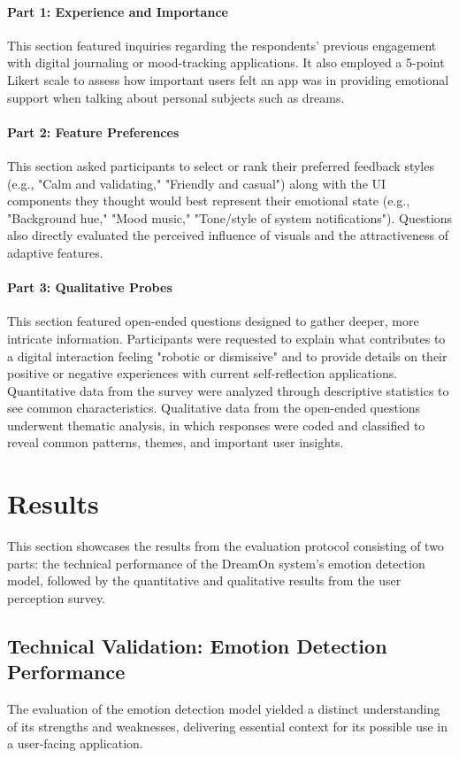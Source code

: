 \documentclass[conference]{IEEEtran}
\begin{document}
	\paragraph{Part 1: Experience and Importance} This section featured inquiries regarding the respondents’ previous engagement with digital journaling or mood-tracking applications. It also employed a 5-point Likert scale to assess how important users felt an app was in providing emotional support when talking about personal subjects such as dreams.
	\paragraph{Part 2: Feature Preferences} This section asked participants to select or rank their preferred feedback styles (e.g., "Calm and validating," "Friendly and casual") along with the UI components they thought would best represent their emotional state (e.g., "Background hue," "Mood music," "Tone/style of system notifications"). Questions also directly evaluated the perceived influence of visuals and the attractiveness of adaptive features.
	\paragraph{Part 3: Qualitative Probes} This section featured open-ended questions designed to gather deeper, more intricate information. Participants were requested to explain what contributes to a digital interaction feeling "robotic or dismissive" and to provide details on their positive or negative experiences with current self-reflection applications.
	Quantitative data from the survey were analyzed through descriptive statistics to see common characteristics. Qualitative data from the open-ended questions underwent thematic analysis, in which responses were coded and classified to reveal common patterns, themes, and important user insights.
	
	\section{Results}
	This section showcases the results from the evaluation protocol consisting of two parts: the technical performance of the DreamOn system's emotion detection model, followed by the quantitative and qualitative results from the user perception survey.
	
	\subsection{Technical Validation: Emotion Detection Performance}
	The evaluation of the emotion detection model yielded a distinct understanding of its strengths and weaknesses, delivering essential context for its possible use in a user-facing application.
	
\end{document}
